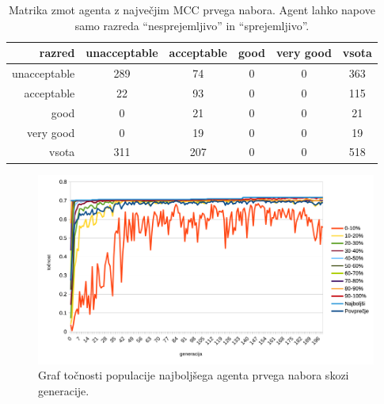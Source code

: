 \begin{table}[H]
    \centering
    \begin{tabular}{||rccccc||}
        \hline
        razred       & unacceptable & acceptable & good & very good & vsota \\ \hline
        unacceptable & 289          & 74         & 0    & 0         & 363   \\ \hline
        acceptable   & 22           & 93         & 0    & 0         & 115   \\ \hline
        good         & 0            & 21         & 0    & 0         & 21    \\ \hline
        very good    & 0            & 19         & 0    & 0         & 19    \\ \hline
        vsota        & 311          & 207        & 0    & 0         & 518   \\ \hline
    \end{tabular}
    \caption{Matrika zmot agenta z največjim MCC prvega nabora. Agent lahko napove samo razreda \enquote{nesprejemljivo} in \enquote{sprejemljivo}.}
    \label{tab:car_mcc_1}
\end{table}

\begin{figure}[H]
    \begin{center}
        \includegraphics[width=13cm]{car/1/acc}
    \end{center}
    \caption{Graf točnosti populacije najboljšega agenta prvega nabora skozi generacije.}
    \label{fig:car_acc_1}
\end{figure}

